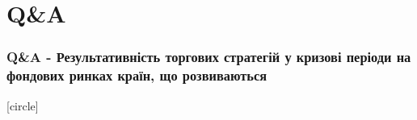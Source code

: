 \documentclass[aspectratio=169]{beamer}
\begin{document}
\section{Q\&A}
\begin{frame}
\frametitle {Q\&A - Результативність торгових стратегій у кризові періоди на фондових ринках країн, що розвиваються}
[circle]
\tableofcontents
\end{frame}
\end{document}
